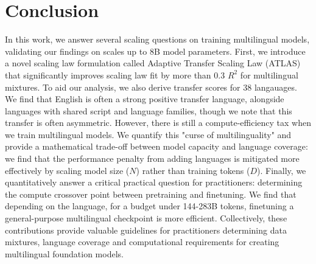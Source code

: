\section{Conclusion}

In this work, we answer several scaling questions on training multilingual models, validating our findings on scales up to 8B model parameters. First, we introduce a novel scaling law formulation called Adaptive Transfer Scaling Law (ATLAS) that significantly improves scaling law fit by more than 0.3 $R^{2}$ for multilingual mixtures. To aid our analysis, we also derive transfer scores for 38 langauages. We find that English is often a strong positive transfer language, alongside languages with shared script and language families, though we note that this transfer is often asymmetric. However, there is still a compute-efficiency tax when we train multilingual models. We quantify this "curse of multilinguality" and provide a mathematical trade-off between model capacity and language coverage: we find that the performance penalty from adding languages is mitigated more effectively by scaling model size ($N$) rather than training tokens ($D$). Finally, we quantitatively answer a critical practical question for practitioners: determining the compute crossover point between pretraining and finetuning. We find that depending on the language, for a budget under 144-283B tokens, finetuning a general-purpose multilingual checkpoint is more efficient. Collectively, these contributions provide valuable guidelines for practitioners determining data mixtures, language coverage and computational requirements for creating multilingual foundation models.
